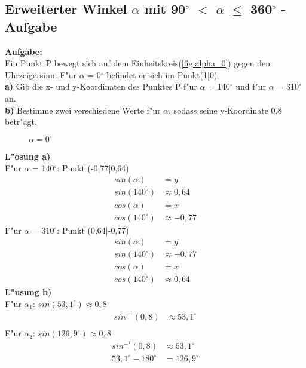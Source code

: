 \documentclass{standalone}
\begin{document}
\subsection{Erweiterter Winkel $\alpha$ mit 90$^\circ$  $<$ $\alpha$ $\leq$ 360$^\circ$  - Aufgabe}

\noindent\textbf{Aufgabe:}\\
Ein Punkt P bewegt sich auf dem Einheitskreis(\autoref{fig:alpha_0}) gegen den Uhrzeigersinn. F{"u}r $\alpha$ = 0$^\circ$  befindet er sich im Punkt(1|0)\\
\textbf{a)} Gib die x- und y-Koordinaten des Punktes P f{"u}r $\alpha$ = 140$^\circ$  und f{"u}r $\alpha$ = 310$^\circ$  an.\\
\textbf{b)} Bestimme zwei verschiedene Werte f{"u}r $\alpha$, sodass seine y-Koordinate 0,8 betr{"a}gt.\\

\begin{figure}[hb!]
  \centering
  \def\svgwidth{200px}
  
  \caption{$\alpha = 0^\circ $}
  \label{fig:alpha_0}
\end{figure}

\newpage

\noindent\textbf{L{"o}sung a)}\\
\noindent F{"u}r $\alpha$ = 140$^\circ$: Punkt (-0,77|0,64)
\begin{align}
  sin(\alpha)     & = y \tag{1}           \\
  sin(140^\circ ) & \approx 0,64 \tag{2}  \\
  cos(\alpha)     & = x \tag{3}           \\
  cos(140^\circ ) & \approx -0,77 \tag{4}
\end{align}
\noindent F{"u}r $\alpha$ = 310$^\circ$: Punkt (0,64|-0,77)
\begin{align}
  sin(\alpha)     & = y \tag{1}           \\
  sin(140^\circ ) & \approx -0,77 \tag{2} \\
  cos(\alpha)     & = x \tag{3}           \\
  cos(140^\circ ) & \approx 0,64 \tag{4}
\end{align}
\noindent\textbf{L{"u}sung b)}\\
\noindent F{"u}r $\alpha_1$: $sin(53,1^\circ) \approx 0,8$
\begin{align}
  sin^-^1(0,8) & \approx 53,1^\circ \tag{1} \\
\end{align}
\noindent F{"u}r $\alpha_2$: $sin(126,9^\circ) \approx 0,8$
\begin{align}
  sin^-^1(0,8)           & \approx 53,1^\circ \tag{1} \\
  53,1^\circ - 180^\circ & = 126,9^\circ \tag{2}
\end{align}
\end{document}
